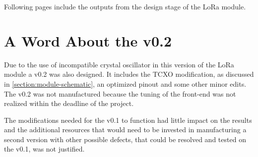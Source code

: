 
Following pages include the outputs from the design stage of the LoRa module.

\section{\label{section:module-v0.2}A Word About the v0.2}
Due to the use of incompatible crystal oscillator in this version of the LoRa module a v0.2 was also designed. It includes the TCXO modification, as discussed in \ref{section:module-schematic}, an optimized pinout and some other minor edits. The v0.2 was not manufactured because the tuning of the front-end was not realized within the deadline of the project. 

The modifications needed for the v0.1 to function had little impact on the results and the additional resources that would need to be invested in manufacturing a second version with other possible defects, that could be resolved and tested on the v0.1, was not justified.


